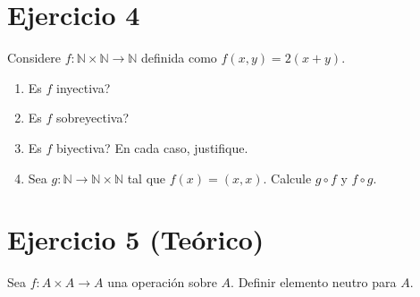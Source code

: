 \documentclass[12pt,a4paper]{article}
\begin{document}
\section*{Ejercicio 4}

Considere $f: \mathbb{N}\times\mathbb{N}\rightarrow\mathbb{N}$ definida
como $f(x,y)= 2(x+y)$.
\begin{enumerate}
\item Es $f$ inyectiva?
\item Es $f$ sobreyectiva?
\item Es $f$ biyectiva?
  En cada caso, justifique.

\item Sea $g :\mathbb{N}\rightarrow\mathbb{N}\times\mathbb{N}$ tal que
  $f(x) = (x,x)$. Calcule $g \circ f$ y $f \circ g$.
\end{enumerate}

\section*{Ejercicio 5 (Te\'orico)}
Sea $f : A\times A\rightarrow A$ una operaci\'on sobre $A$.
Definir elemento neutro para $A$.
\end{document}
